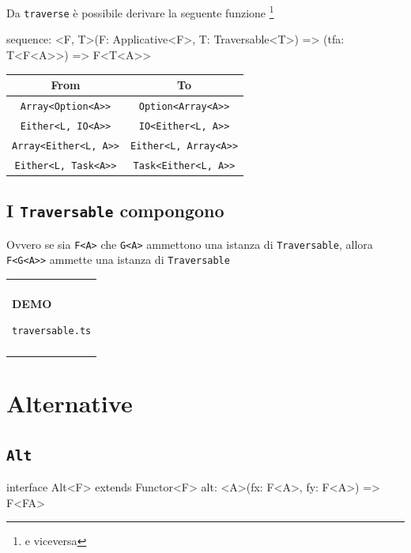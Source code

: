 \documentclass[12pt]{article}
\theoremstyle{definition}
\newenvironment{demo}
    {\begin{center}
    \begin{tabular}{|p{0.9\textwidth}|}
    \hline\\
    }
    {
    \\\\\hline
    \end{tabular}
    \end{center}
    }
\newenvironment{code}
  {\vspace{0.5cm} \VerbatimEnvironment\begin{typescriptcode}}
  {\end{typescriptcode} \vspace{0.2cm}}
\begin{document}
Da \texttt{traverse} è possibile derivare la seguente funzione \footnote{e viceversa}

\begin{code}
sequence: <F, T>(F: Applicative<F>, T: Traversable<T>) =>
  (tfa: T<F<A>>) => F<T<A>>
\end{code}

\begin{center}
\bgroup
\def\arraystretch{1.5}
\begin{tabular}{ |c|c| }
\hline
From & To \\
\hline
\texttt{Array<Option<A>>} & \texttt{Option<Array<A>>} \\
\hline
\texttt{Either<L, IO<A>>} & \texttt{IO<Either<L, A>>} \\
\hline
\texttt{Array<Either<L, A>>} & \texttt{Either<L, Array<A>>} \\
\hline
\texttt{Either<L, Task<A>>} & \texttt{Task<Either<L, A>>} \\
\hline
\end{tabular}
\egroup
\end{center}

\subsection{I \texttt{Traversable} compongono}

Ovvero se sia \texttt{F<A>} che \texttt{G<A>} ammettono una istanza di \texttt{Traversable}, allora \texttt{F<G<A>>} ammette una istanza di \texttt{Traversable}

\begin{demo}
\begin{center}
\textbf{DEMO}

\texttt{traversable.ts}
\end{center}
\end{demo}

\newpage

\section{Alternative}

\subsection{\texttt{Alt}}

\begin{code}
interface Alt<F> extends Functor<F> {
  alt: <A>(fx: F<A>, fy: F<A>) => F<FA>
}
\end{code}
\end{document}
